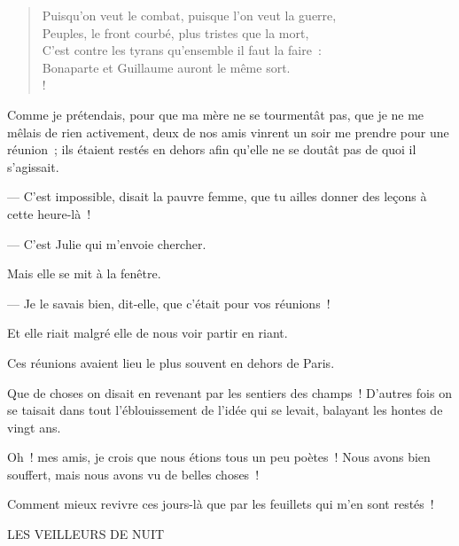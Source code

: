 \documentclass[french,twoside]{book} %
\def\mednobreak{\ifdim\lastskip<\medskipamount
  \removelastskip\nopagebreak\medskip\fi}
\newcommand{\labelblock}[1]{\medbreak{\noindent\color{rubric}\bfseries #1}\par\mednobreak}
\newenvironment{quoteblock}%
  {\begin{quoting}}
  {\end{quoting}}
\newenvironment{quotebar}{%
    \def\FrameCommand{{\color{rubric!10!}\vrule width 0.5em} \hspace{0.9em}}%
    \def\OuterFrameSep{\itemsep} %
    \MakeFramed {\advance\hsize-\width \FrameRestore}
  }%
  {%
    \endMakeFramed
  }
\renewenvironment{quoteblock}%
  {%
    \savenotes
    \setstretch{0.9}
    \normalfont
    \begin{quotebar}
  }
  {%
    \end{quotebar}
    \spewnotes
  }
\begin{document}
\begin{verse}
Puisqu’on veut le combat, puisque l’on veut la guerre,\\
Peuples, le front courbé, plus tristes que la mort,\\
C’est contre les tyrans qu’ensemble il faut la faire :\\
Bonaparte et Guillaume auront le même sort.\\!
\end{verse}

\noindent Comme je prétendais, pour que ma mère ne se tourmentât pas, que je ne me mêlais de rien activement, deux de nos amis vinrent un soir me prendre pour une réunion ; ils étaient restés en dehors afin qu’elle ne se doutât pas de quoi il s’agissait.\par
— C’est impossible, disait la pauvre femme, que tu ailles donner des leçons à cette heure-là !\par
— C’est Julie qui m’envoie chercher.\par
Mais elle se mit à la fenêtre.\par
— Je le savais bien, dit-elle, que c’était pour vos réunions !\par
Et elle riait malgré elle de nous voir partir en riant.\par
Ces réunions avaient lieu le plus souvent en dehors de Paris.\par
Que de choses on disait en revenant par les sentiers des champs ! D’autres fois on se taisait dans tout l’éblouissement de l’idée qui se levait, balayant les hontes de vingt ans.\par
Oh ! mes amis, je crois que nous étions tous un peu poètes ! Nous avons bien souffert, mais nous avons vu de belles choses !\par
 Comment mieux revivre ces jours-là que par les feuillets qui m’en sont restés !\par

\begin{quoteblock}
LES VEILLEURS DE NUIT
\labelblock{I}

\end{quoteblock}
\end{document}
